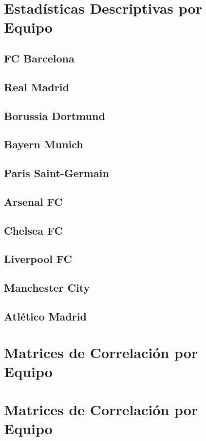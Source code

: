 \documentclass[12pt,a4paper]{article}
\begin{document}
	\newpage

	
	
	\section{Estadísticas Descriptivas por Equipo}
	
	\subsection{FC Barcelona}
	
	
	\subsection{Real Madrid}
	
	
	\subsection{Borussia Dortmund}
	
	
	\subsection{Bayern Munich}
	
	
	\subsection{Paris Saint-Germain}
	
	
	\subsection{Arsenal FC}
	
	
	\subsection{Chelsea FC}
	
	
	\subsection{Liverpool FC}
	
	
	\subsection{Manchester City}
	
	
	\subsection{Atlético Madrid}
	
	
	\newpage
	\section{Matrices de Correlación por Equipo}
	
	\newpage
	\section{Matrices de Correlación por Equipo}
	
	
\end{document}
